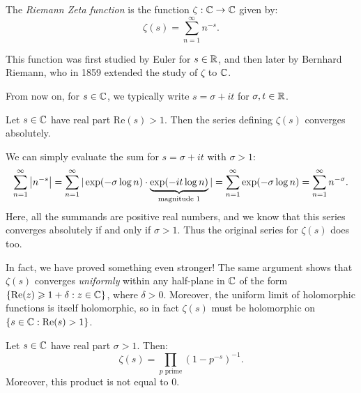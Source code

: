 \documentclass{article}
\begin{document}
\begin{definition}
	\label{riemann-zeta-function}
    The \textit{Riemann Zeta function} is the function $\zeta : \mathbb{C} \to \mathbb{C}$ given by:
    \[
	\zeta(s) = \sum_{n=1}^\infty n^{-s}.
	\]
\end{definition}

This function was first studied by Euler for $s \in \mathbb{R}$, and then later by Bernhard Riemann, who in 1859 extended the study of $\zeta$ to $\mathbb{C}$.

\begin{note}
	From now on, for $s \in \mathbb{C}$, we typically write $s = \sigma + it$ for $\sigma, t \in \mathbb{R}$.
\end{note}

\begin{proposition}
    Let $s \in \mathbb{C}$ have real part $\mathrm{Re}(s) > 1$. Then the series defining $\zeta(s)$ converges absolutely.
\end{proposition}

\begin{prf}
    We can simply evaluate the sum for $s = \sigma + it$ with $\sigma > 1$:
    \begin{align*}
    	\sum_{n=1}^\infty \left\lvert n^{-s} \right\rvert = 
    	\sum_{n=1}^\infty | \exp(-\sigma \log n) \cdot
    	\underbrace{\exp(-it \log n)}_{\text{magnitude 1}} | =
    	\sum_{n=1}^\infty \exp(-\sigma \log n) =
    	\sum_{n=1}^\infty n^{-\sigma}.
	\end{align*}
	Here, all the summands are positive real numbers, and we know that this series converges absolutely if and only if $\sigma > 1$. Thus the original series for $\zeta(s)$ does too.
\end{prf}

\begin{corollary}
    In fact, we have proved something even stronger! The same argument shows that $\zeta(s)$ converges \textit{uniformly} within any half-plane in $\mathbb{C}$ of the form $\left\lbrace \mathrm{Re}(z) \geqslant 1 + \delta : z \in \mathbb{C} \right\rbrace$, where $\delta > 0$. Moreover, the uniform limit of holomorphic functions is itself holomorphic, so in fact $\zeta(s)$ must be holomorphic on $\left\lbrace s \in \mathbb{C} : \mathrm{Re}(s) > 1 \right\rbrace$.
\end{corollary}

\begin{proposition}
	\label{euler-product}
    Let $s \in \mathbb{C}$ have real part $\sigma > 1$. Then:
    \[
	\zeta(s) = \prod_{p \text{ prime}}
	\left( 1 - p^{-s} \right)^{-1}.
	\]
	Moreover, this product is not equal to 0.
\end{proposition}
\end{document}
